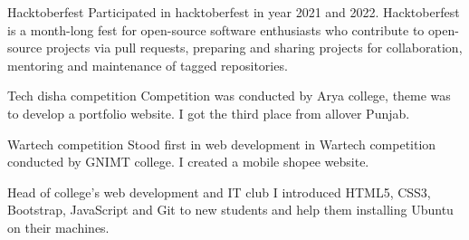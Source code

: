     {Hacktoberfest}
    {}
    {}
    {}
    {Participated in hacktoberfest in year 2021 and 2022. Hacktoberfest is a month-long fest for open-source software enthusiasts who contribute to open-source projects via pull requests, preparing and sharing projects for collaboration, mentoring and maintenance of tagged repositories.}
    {}


    {Tech disha competition}
    {}
    {}
    {}
    {Competition was conducted by Arya college, theme was to develop a portfolio website. I got the third place from allover Punjab.}
    {}

    
    {Wartech competition}
    {}
    {}
    {}
    {Stood first in web development in Wartech competition conducted by GNIMT college. I created a mobile shopee website.}
    {}



    {Head of college's web development and IT club}
    {}
    {}
    {}
    {I introduced HTML5, CSS3, Bootstrap, JavaScript and Git to new students and help them installing Ubuntu on their machines.}
    {}

